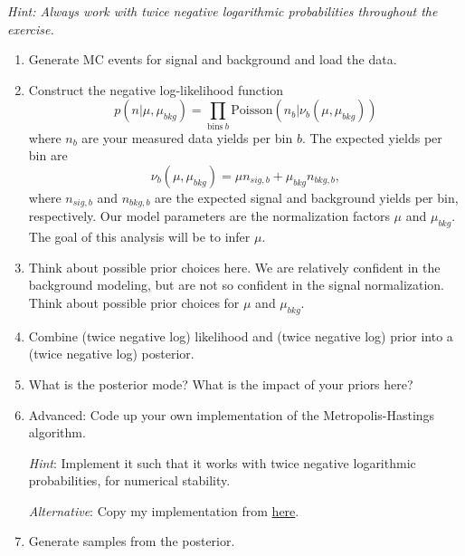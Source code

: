 \documentclass{article}
\begin{document}
\textit{Hint: Always work with twice negative logarithmic probabilities throughout the exercise.}
\begin{enumerate}
    \item Generate MC events for signal and background and load the data. %

    \item Construct the negative log-likelihood function
    $$p(n|\mu, \mu_{bkg}) = \prod_{\mathrm{bins}~b} \mathrm{Poisson}(n_b|\nu_b(\mu, \mu_{bkg}))$$
    where $n_b$ are your measured data yields per bin $b$. The expected yields per bin are
    $$\nu_b(\mu, \mu_{bkg}) = \mu n_{sig,b} + \mu_{bkg} n_{bkg, b},$$
    where $n_{sig,b}$ and $n_{bkg,b}$ are the expected signal and background yields per bin, respectively. Our model parameters are the normalization factors $\mu$ and $\mu_{bkg}$. The goal of this analysis will be to infer $\mu$.

    \item Think about possible prior choices here. We are relatively confident in the background modeling, but are not so confident in the signal normalization. Think about possible prior choices for $\mu$ and $\mu_{bkg}$.

    \item Combine (twice negative log) likelihood and (twice negative log) prior into a (twice negative log) posterior.

    \item What is the posterior mode? What is the impact of your priors here?


    \item {Advanced}: Code up your own implementation of the Metropolis-Hastings algorithm.

    \textit{Hint}: Implement it such that it works with twice negative logarithmic probabilities, for numerical stability.

    \textit{Alternative}: Copy my implementation from \href{https://github.com/lorenzennio/icsc-bayesian-inference/blob/main/mcmc.py}{here}.

    \item Generate samples from the posterior.


\end{enumerate}
\end{document}
